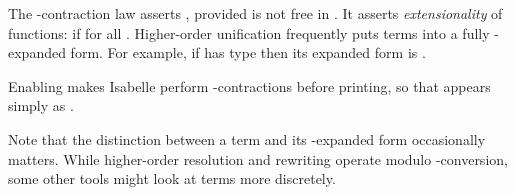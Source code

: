 \begin{isabellebody}
\begin{isamarkuptext}
\begin{description}
  The -contraction law asserts ,
  provided  is not free in .  It asserts
  \emph{extensionality} of functions:  if  for all .  Higher-order unification frequently puts
  terms into a fully -expanded form.  For example, if  has type  then its expanded form is .

  Enabling \hyperlink{attribute.eta-contract}{\mbox{}} makes Isabelle perform -contractions before printing, so that 
  appears simply as .

  Note that the distinction between a term and its -expanded
  form occasionally matters.  While higher-order resolution and
  rewriting operate modulo -conversion, some other tools
  might look at terms more discretely.


\end{description}
\end{isamarkuptext}
\end{isabellebody}
